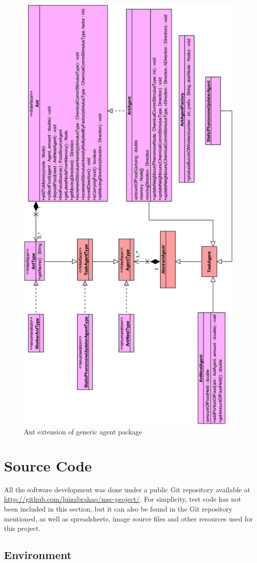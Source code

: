 \begin{figure}[H]
  \centering
  \includegraphics[width=0.7\linewidth]{gfx/ant-agent.png}
  \caption{Ant extension of generic agent package}
  \label{fig:ant-agent}
\end{figure}

\section{Source Code}

All the software development was done under a public Git repository available at \url{http://github.com/luizabrahao/msc-project/}. For simplicity, test code has not been included in this section, but it can also be found in the Git repository mentioned, as well as spreadsheets, image source files and other resources used for this project.

\subsection{Environment}
\label{code:env}

